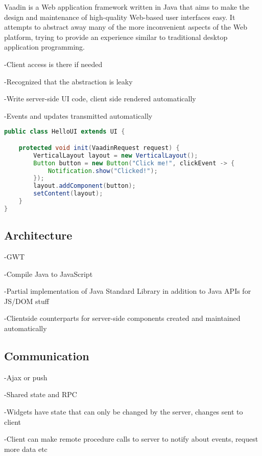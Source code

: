 Vaadin is a Web application framework written in Java that aims to make the design and maintenance of high-quality Web-based user interfaces easy. It attempts to abstract away many of the more inconvenient aspects of the Web platform, trying to provide an experience similar to traditional desktop application programming.

-Client access is there if needed

-Recognized that the abstraction is leaky

-Write server-side UI code, client side rendered automatically

-Events and updates transmitted automatically

\begin{code}
\begin{lstlisting}[language=Java,caption=A simple Vaadin application.\label{listing:vaadin-ui}]
public class HelloUI extends UI {

    protected void init(VaadinRequest request) {
        VerticalLayout layout = new VerticalLayout();
        Button button = new Button("Click me!", clickEvent -> {
            Notification.show("Clicked!");
        });    
        layout.addComponent(button);
        setContent(layout);
    }
}
\end{lstlisting}
\end{code}

\subsection{Architecture}

-GWT

-Compile Java to JavaScript

-Partial implementation of Java Standard Library in addition to Java APIs for JS/DOM stuff

-Clientside counterparts for server-side components created and maintained automatically

\subsection{Communication}

-Ajax or push

-Shared state and RPC

-Widgets have state that can only be changed by the server, changes sent to client

-Client can make remote procedure calls to server to notify about events, request more data etc

